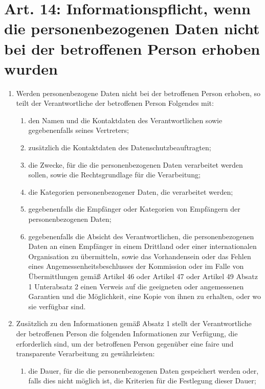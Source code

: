 \documentclass[A4, 12pt]{scrbook}
\begin{document}
    \section[Art. 14: Informationspflicht]{Art. 14: Informationspflicht, wenn die personenbezogenen Daten nicht bei der betroffenen Person
erhoben wurden}
    \begin{enumerate}[label=(\arabic*)]
        \item Werden personenbezogene Daten nicht bei der betroffenen Person erhoben, so teilt der Verantwortliche der betroffenen Person Folgendes mit:
            \begin{enumerate}[label=\alph*)]
                \item den Namen und die Kontaktdaten des Verantwortlichen sowie gegebenenfalls seines Vertreters;
                \item zusätzlich die Kontaktdaten des Datenschutzbeauftragten;
                \item die Zwecke, für die die personenbezogenen Daten verarbeitet werden sollen, sowie die Rechtsgrundlage für die
Verarbeitung;
                \item die Kategorien personenbezogener Daten, die verarbeitet werden;
                \item gegebenenfalls die Empfänger oder Kategorien von Empfängern der personenbezogenen Daten;
                \item gegebenenfalls die Absicht des Verantwortlichen, die personenbezogenen Daten an einen Empfänger in einem Drittland oder einer internationalen Organisation zu übermitteln, sowie das Vorhandensein oder das Fehlen eines Angemessenheitsbeschlusses der Kommission oder im Falle von Übermittlungen gemäß Artikel 46 oder Artikel 47 oder Artikel 49 Absatz 1 Unterabsatz 2 einen Verweis auf die geeigneten oder angemessenen Garantien und die Möglichkeit, eine Kopie von ihnen zu erhalten, oder wo sie verfügbar sind. 
            \end{enumerate}
        \item Zusätzlich zu den Informationen gemäß Absatz 1 stellt der Verantwortliche der betroffenen Person die folgenden Informationen zur Verfügung, die erforderlich sind, um der betroffenen Person gegenüber eine faire und transparente Verarbeitung zu gewährleisten:
            \begin{enumerate}[label=\alph*)]
                \item die Dauer, für die die personenbezogenen Daten gespeichert werden oder, falls dies nicht möglich ist, die Kriterien für die Festlegung dieser Dauer;

\end{enumerate}
\end{enumerate}
\end{document}
